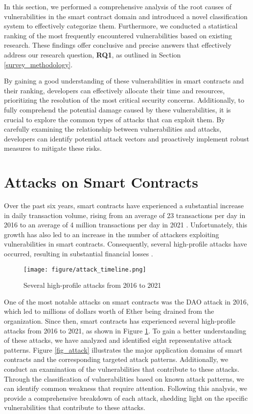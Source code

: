 \documentclass[manuscript,screen]{acmart}
\begin{document}
In this section, we performed a comprehensive analysis of the root causes of vulnerabilities in the smart contract domain and introduced a novel classification system to effectively categorize them. Furthermore, we conducted a statistical ranking of the most frequently encountered vulnerabilities based on existing research. These findings offer conclusive and precise answers that effectively address our research question, \textbf{RQ1}, as outlined in Section \ref{survey_methodology}. 

By gaining a good understanding of these vulnerabilities in smart contracts and their ranking, developers can effectively allocate their time and resources, prioritizing the resolution of the most critical security concerns. Additionally, to fully comprehend the potential damage caused by these vulnerabilities, it is crucial to explore the common types of attacks that can exploit them. By carefully examining the relationship between vulnerabilities and attacks, developers can identify potential attack vectors and proactively implement robust measures to mitigate these risks.

\section{Attacks on Smart Contracts}
\label{attacks}
Over the past six years, smart contracts have experienced a substantial increase in daily transaction volume, rising from an average of 23 transactions per day in 2016 to an average of 4 million transactions per day in 2021 \cite{etherdailytx}. Unfortunately, this growth has also led to an increase in the number of attackers exploiting vulnerabilities in smart contracts. Consequently, several high-profile attacks have occurred, resulting in substantial financial losses \cite{Charles}. 

\begin{figure}[!ht]
  \centering
  \texttt{[image: figure/attack\_timeline.png]}
  \caption{Several high-profile attacks from 2016 to 2021}
  \label{fig_attack_timeline}
\end{figure}

One of the most notable attacks on smart contracts was the DAO attack in 2016, which led to millions of dollars worth of Ether being drained from the organization. Since then, smart contracts has experienced several high-profile attacks from 2016 to 2021, as shown in Figure \ref{fig_attack_timeline}. 
To gain a better understanding of these attacks, we have analyzed and identified eight representative attack patterns. Figure \ref{fig_attack} illustrates the major application domains of smart contracts and the corresponding targeted attack patterns. Additionally, we conduct an examination of the vulnerabilities that contribute to these attacks. Through the classification of vulnerabilities based on known attack patterns, we can identify common weakness that require attention.
Following this analysis, we provide a comprehensive breakdown of each attack, shedding light on the specific vulnerabilities that contribute to these attacks. 
\end{document}
